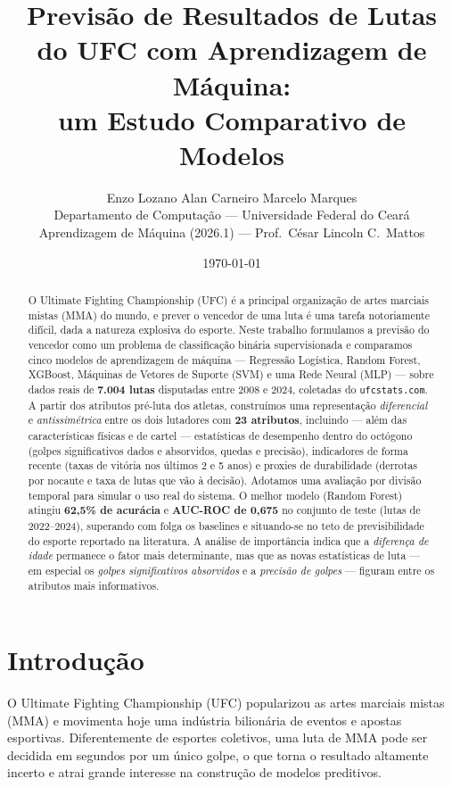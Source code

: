 \documentclass[10pt]{article}
\title{Previsão de Resultados de Lutas do UFC com Aprendizagem de Máquina:\\
um Estudo Comparativo de Modelos}
\author{Enzo Lozano \quad Alan Carneiro \quad Marcelo Marques\\
  Departamento de Computação --- Universidade Federal do Ceará\\
  Aprendizagem de Máquina (2026.1) --- Prof.\ César Lincoln C.\ Mattos}
\date{\today}
\begin{document}
\maketitle

\begin{abstract}
O Ultimate Fighting Championship (UFC) é a principal organização de artes
marciais mistas (MMA) do mundo, e prever o vencedor de uma luta é uma tarefa
notoriamente difícil, dada a natureza explosiva do esporte. Neste trabalho
formulamos a previsão do vencedor como um problema de classificação binária
supervisionada e comparamos cinco modelos de aprendizagem de máquina ---
Regressão Logística, Random Forest, XGBoost, Máquinas de Vetores de Suporte
(SVM) e uma Rede Neural (MLP) --- sobre dados reais de \textbf{7.004 lutas}
disputadas entre 2008 e 2024, coletadas do \texttt{ufcstats.com}. A partir dos
atributos pré-luta dos atletas, construímos uma representação \emph{diferencial}
e \emph{antissimétrica} entre os dois lutadores com \textbf{23 atributos},
incluindo --- além das características físicas e de cartel --- estatísticas de
desempenho dentro do octógono (golpes significativos dados e absorvidos,
quedas e precisão), indicadores de forma recente (taxas de vitória nos últimos
2 e 5 anos) e proxies de durabilidade (derrotas por nocaute e taxa de lutas que
vão à decisão). Adotamos uma avaliação por divisão temporal para simular o uso
real do sistema. O melhor modelo (Random Forest) atingiu \textbf{62,5\% de
acurácia} e \textbf{AUC-ROC de 0,675} no conjunto de teste (lutas de
2022--2024), superando com folga os baselines e situando-se no teto de
previsibilidade do esporte reportado na literatura. A análise de importância
indica que a \emph{diferença de idade} permanece o fator mais determinante, mas
que as novas estatísticas de luta --- em especial os \emph{golpes
significativos absorvidos} e a \emph{precisão de golpes} --- figuram entre os
atributos mais informativos.
\end{abstract}

\section{Introdução}
O Ultimate Fighting Championship (UFC) popularizou as artes marciais mistas
(MMA) e movimenta hoje uma indústria bilionária de eventos e apostas
esportivas. Diferentemente de esportes coletivos, uma luta de MMA pode ser
decidida em segundos por um único golpe, o que torna o resultado altamente
incerto e atrai grande interesse na construção de modelos preditivos.
\end{document}
